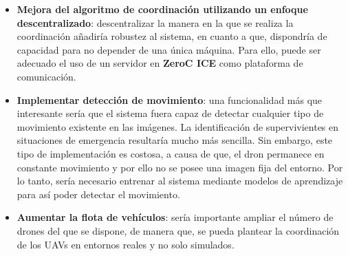 \begin{itemize}
\item \textbf{Mejora del algoritmo de coordinación utilizando un enfoque descentralizado}: descentralizar la manera en la que se realiza la coordinación añadiría robustez al sistema, en cuanto a que, dispondría de capacidad para no depender de una única máquina. Para ello, puede ser adecuado el uso de un servidor en \textbf{ZeroC \acs{ICE}} como plataforma de comunicación.
\item \textbf{Implementar detección de movimiento}: una funcionalidad más que interesante sería que el sistema fuera capaz de detectar cualquier tipo de movimiento existente en las imágenes. La identificación de supervivientes en situaciones de emergencia resultaría mucho más sencilla. Sin embargo, este tipo de implementación es costosa, a causa de que, el dron permanece en constante movimiento y por ello no se posee una imagen fija del entorno. Por lo tanto, sería necesario entrenar al sistema mediante modelos de aprendizaje para así poder detectar el movimiento.
\item \textbf{Aumentar la flota de vehículos}: sería importante ampliar el número de drones del que se dispone, de manera que, se pueda plantear la coordinación de los \acs{UAV}s en entornos reales y no solo simulados.
\end{itemize}


